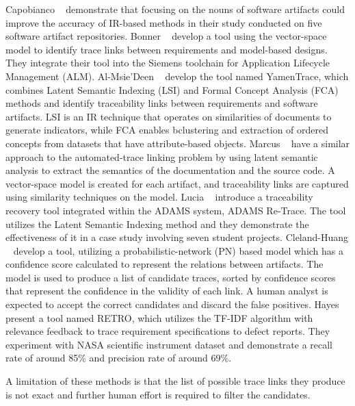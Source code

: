 Capobianco \etal{}~\cite{capobianco-2013} demonstrate that focusing on the nouns of software artifacts could improve the accuracy of IR-based methods in their study conducted on five software artifact repositories.
Bonner \etal{}~\cite{bonner-2023} develop a tool using the vector-space model to identify trace links between requirements and model-based designs. They  integrate their tool into the Siemens toolchain for Application Lifecycle Management (ALM).
Al-Msie'Deen \etal{}~\cite{deen-2023} develop the tool named YamenTrace, which combines Latent Semantic Indexing (LSI) and Formal Concept Analysis (FCA) methods and identify traceability links between requirements and software artifacts. LSI is an IR technique that operates on similarities of documents to generate indicators, while FCA enables bclustering and extraction of ordered concepts from datasets that have attribute-based objects.
Marcus \etal{}~\cite{marcus-2003} have a similar approach to the automated-trace linking problem by using latent semantic analysis to extract the semantics of the documentation and the source code. A vector-space model is created for each artifact, and traceability links are captured using similarity techniques on the model.
Lucia \etal{}~\cite{fasano-2005} introduce a traceability recovery tool integrated within the ADAMS system, ADAMS Re-Trace. The tool utilizes the Latent Semantic Indexing method and they demonstrate the effectiveness of it in a case study involving seven student projects.
Cleland-Huang \etal{}~\cite{cleland-huang-2007} develop a tool, utilizing a probabilistic-network (PN) based model which has a confidence score calculated to represent the relations between artifacts. The model is used to produce a list of candidate traces, sorted by confidence scores that represent the confidence in the validity of each link. A human analyst is expected to accept the correct candidates and discard the false positives. %
Hayes \etal{}~\cite{hayes-2005} present a tool named RETRO, which utilizes the TF-IDF algorithm with relevance feedback to trace requirement specifications to defect reports. They experiment with NASA scientific instrument dataset and demonstrate a recall rate of around 85\% and precision rate of around 69\%.


A limitation of these methods is that the list of possible trace links they produce is not exact and further human effort is required to filter the candidates.

